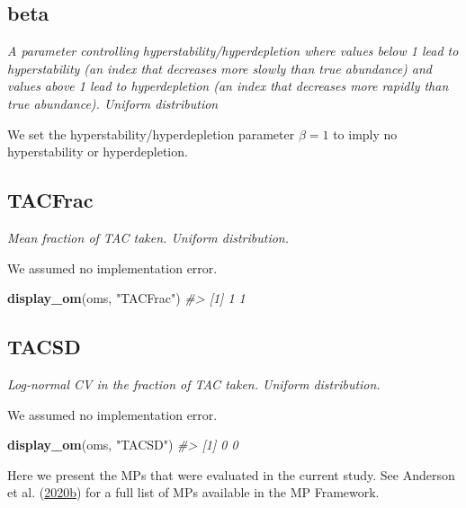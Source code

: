 \documentclass[11pt]{book}
\newenvironment{Shaded}{\begin{snugshade}}{\end{snugshade}}
\newcommand{\CommentTok}[1]{\textcolor[rgb]{0.56,0.35,0.01}{\textit{#1}}}
\newcommand{\KeywordTok}[1]{\textcolor[rgb]{0.13,0.29,0.53}{\textbf{#1}}}
\newcommand{\NormalTok}[1]{#1}
\newcommand{\StringTok}[1]{\textcolor[rgb]{0.31,0.60,0.02}{#1}}
\begin{document}
\label{app:desc-obs-beta-yelloweye}
\subsection{beta}

\emph{A parameter controlling hyperstability/hyperdepletion where values below 1 lead to hyperstability (an index that decreases more slowly than true abundance) and values above 1 lead to hyperdepletion (an index that decreases more rapidly than true abundance). Uniform distribution}

We set the hyperstability/hyperdepletion parameter \(\beta = 1\) to imply no hyperstability or hyperdepletion.

\label{app:desc-imp-yelloweye}

\label{app:desc-imp-tacfrac-yelloweye}
\subsection{TACFrac}

\emph{Mean fraction of TAC taken. Uniform distribution.}

We assumed no implementation error.
\begin{Shaded}
\begin{Highlighting}[]
\KeywordTok{display_om}\NormalTok{(oms, }\StringTok{"TACFrac"}\NormalTok{)}
\CommentTok{#> [1] 1 1}
\end{Highlighting}
\end{Shaded}
\label{app:desc-imp-tacsd-yelloweye}
\subsection{TACSD}

\emph{Log-normal CV in the fraction of TAC taken. Uniform distribution.}

We assumed no implementation error.
\begin{Shaded}
\begin{Highlighting}[]
\KeywordTok{display_om}\NormalTok{(oms, }\StringTok{"TACSD"}\NormalTok{)}
\CommentTok{#> [1] 0 0}
\end{Highlighting}
\end{Shaded}
\newpage


\clearpage

\label{app:mps}

Here we present the MPs that were evaluated in the current study. See Anderson et al. (\protect\hyperlink{ref-anderson2020gfmp}{2020}\protect\hyperlink{ref-anderson2020gfmp}{b}) for a full list of MPs available in the MP Framework.
\end{document}
